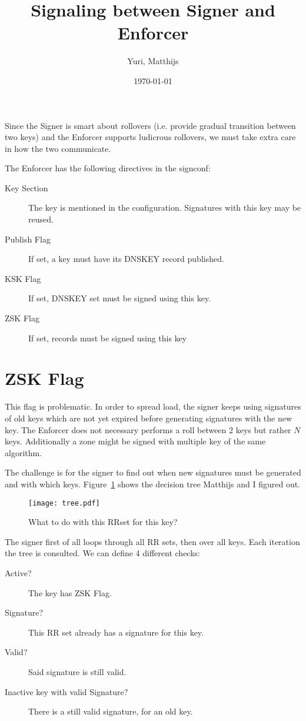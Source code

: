 \documentclass[twoside, a4paper]{article}
\title{Signaling between Signer and Enforcer}
\author{Yuri, Matthijs}
\date{\today}
\begin{document}
\maketitle

Since the Signer is smart about rollovers (i.e. provide gradual 
transition between two keys) and the Enforcer supports ludicrous 
rollovers, we must take extra care in how the two communicate.

The Enforcer has the following directives in the signconf:

\begin{description}
\item[Key Section] The key is mentioned in the configuration. 
Signatures with this key may be reused.
\item[Publish Flag] If set, a key must have its DNSKEY record
published.
\item[KSK Flag] If set, DNSKEY set must be signed using this key.
\item[ZSK Flag] If set, records must be signed using this key
\end{description}

\section{ZSK Flag}

This flag is problematic. In order to spread load, the signer keeps 
using signatures of old keys which are not yet expired before generating
signatures with the new key. 
The Enforcer does not necessary performs a roll between 2 keys but
rather $N$ keys. Additionally a zone might be signed with multiple key
of the same algorithm.

The challenge is for the signer to find out when new signatures must be 
generated and with which keys. Figure~\ref{fig:tree} shows the 
decision tree Matthijs and I figured out.

\begin{figure}[h]
\centering
\texttt{[image: tree.pdf]}
\caption{What to do with this RRset for this key?}
\label{fig:tree}
\end{figure}

The signer first of all loops through all RR sets, then over all keys.
Each iteration the tree is consulted. We can define 4 different checks:

\begin{description}
\item[Active?] The key has ZSK Flag.
\item[Signature?] This RR set already has a signature for this key.
\item[Valid?] Said signature is still valid.
\item[Inactive key with valid Signature?] There is a still valid 
signature, for an old key.
\end{description}
\end{document}
